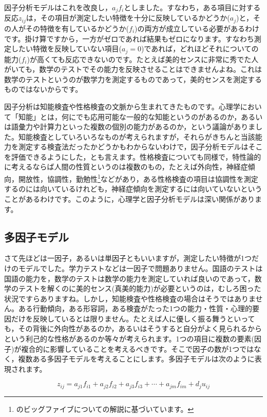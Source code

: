 \documentclass{ltjsbook}
\begin{document}
因子分析モデルはこれを改良し，$a_j f_i$としました。すなわち，ある項目に対する反応$z_{ij}$は，その項目が測定したい特徴を十分に反映しているかどうか($a_j$)と，その人がその特徴を有しているかどうか($f_i$)の両方が成立している必要があるわけです。掛け算ですから，一方がゼロであれば結果もゼロになります。すなわち測定したい特徴を反映していない項目($a_j=0$)であれば，どれほどそれについての能力($f_i$)が高くても反応できないのです。たとえば美的センスに非常に秀でた人がいても，数学のテストでその能力を反映させることはできませんよね。これは数学のテストというのが数学力を測定するものであって，美的センスを測定するものではないからです。

因子分析は知能検査や性格検査の文脈から生まれてきたものです。心理学において「知能」とは，何にでも応用可能な一般的な知能というのがあるのか，あるいは語彙力や計算力といった複数の個別の能力があるのか，という議論がありました。知能検査としていろいろなものが考えられますが，それらがきちんと当該能力を測定する検査法だったかどうかもわからないわけで，因子分析モデルはそこを評価できるようにした，とも言えます。性格検査についても同様で，特性論的に考えるならば人間の性質というのは複数のもの，たとえば外向性，神経症傾向，開放性，協調性，勤勉性\footnote{\textcite{Oshio2020}のビッグファイブについての解説に基づいています。}などがあり，ある性格検査の項目は協調性を測定するのには向いているけれども，神経症傾向を測定するには向いていないということがあるわけです。このように，心理学と因子分析モデルは深い関係があります。

\subsection{多因子モデル}
さて先ほどは一因子，あるいは単因子ともいいますが，測定したい特徴が1つだけのモデルでした。学力テストなどは一因子で問題ありません。国語のテストは国語の能力を，数学のテストは数学の能力を測定していれば良いのであって，数学のテストを解くのに美的センス(真美的能力)が必要というのは，むしろ困った状況ですらありますね。しかし，知能検査や性格検査の場合はそうではありません。ある行動傾向，ある形容詞，ある検査がたった1つの能力・性質・心理的要因だけを反映しているとは限りません。たとえば人に優しく振る舞うといっても，その背後に外向性があるのか，あるいはそうすると自分がよく見られるからという利己的な性格があるのか等々が考えられます。1つの項目に複数の要素(因子)が複合的に影響していることを考えるべきです。そこで因子の数が1つではなく，複数ある多因子モデルを考えることにします。多因子モデルは次のように表現されます。

\begin{equation}
	z_{ij} = a_{j1}f_{i1} + a_{j2}f_{i2}+a_{j3}f_{i3} + \cdots + a_{jm}f_{im} + d_j u_{ij}
	\label{factor}
\end{equation}
\end{document}

